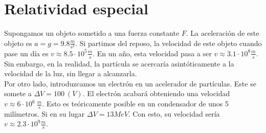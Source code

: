 \documentclass{./Mecanica.tex}
\begin{document}
\chapter{Relatividad especial}
Supongamos un objeto sometido a una fuerza constante $F$. La aceleración de este objeto es $a=g=9.8 \frac{m}{s^{2}}$. Si partimos del reposo, la velocidad de este objeto cuando pase un día es $v \approx 8.5 \cdot 10^{5} \frac{m}{s}$. En un año, esta velocidad pasa a ser $v \approx 3.1 \cdot 10^{8} \frac{m}{s}$. Sin embargo, en la realidad, la partícula se acercaría asintóticamente a la velocidad de la luz, sin llegar a alcanzarla.\\
Por otro lado, introduzcamos un electrón en un acelerador de partículas. Este se somete a $\Delta V = 100~(V)$. El electrón acabará obteniendo una velocidad $v\approx 6\cdot 10^{6}~\frac{m}{s}$. Esto es teóricamente posible en un condensador de unos 5 milímetros. Si en su lugar $\Delta V = 13MeV$. Con esto, su velocidad sería $v\approx 2.3\cdot 10^{9} \frac{m}{s}$.  
\end{document}
